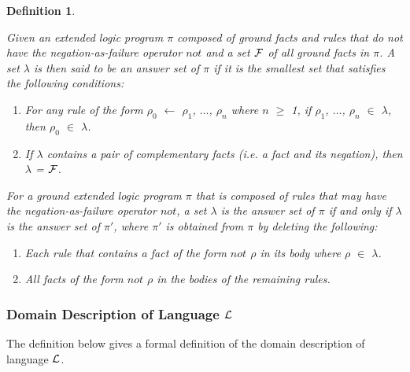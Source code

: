 \documentclass[11pt]{report}
\newtheorem{vdefinition}{Definition}[chapter]
\begin{document}
        \begin{vdefinition}
          \label{def-ans}

          Given an extended logic program $\pi$ composed of ground facts and
          rules that do not have the negation-as-failure operator $not$ and a
          set ${\cal F}$ of all ground facts in $\pi$. A set $\lambda$ is
          then said to be an answer set of $\pi$ if it is the smallest set
          that satisfies the following conditions:

          \begin{enumerate}
            \item
              For any rule of the form $\rho_{0}$ $\leftarrow$ $\rho_{1}$,
              $\hdots$, $\rho_{n}$ where $n$ $\geq$ 1, if $\rho_{1}$, $\hdots$,
              $\rho_{n}$ $\in$ $\lambda$, then
              $\rho_{0}$ $\in$ $\lambda$.

            \item
              If $\lambda$ contains a pair of complementary facts (i.e. a fact
              and its negation), then $\lambda$ = ${\cal F}$.
          \end{enumerate}

          For a ground extended logic program $\pi$ that is composed of rules
          that may have the negation-as-failure operator $not$, a set $\lambda$
          is the answer set of $\pi$ if and only if $\lambda$ is the answer set
          of $\pi'$, where $\pi'$ is obtained from $\pi$ by deleting the
          following:

          \begin{enumerate}
            \item
              Each rule that contains a fact of the form $not$ $\rho$ in its
              body where $\rho$ $\in$ $\lambda$.
            \item
              All facts of the form $not$ $\rho$ in the bodies of the remaining
              rules.
          \end{enumerate}
        \end{vdefinition}

        \subsubsection{Domain Description of Language ${\cal L}$}

          The definition below gives a formal definition of the domain
          description of language ${\cal L}$.
\end{document}
